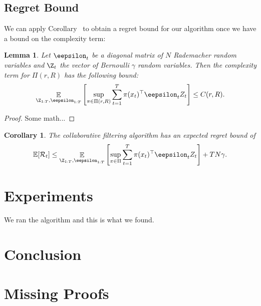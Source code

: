 \documentclass[11pt]{article}
\newcommand{\exop}{\mathop{\ex}}
\newcommand{\regret}{\mathcal{R}}
\newtheorem{lemma}{Lemma}
\newtheorem{corollary}{Corollary}
\begin{document}
\subsection{Regret Bound}
We can apply Corollary~\label{cor:oracle.regret.bound} to obtain a regret bound for our algorithm once we have a bound on the complexity term:
\begin{lemma} Let $\eepsilon_t$ be a diagonal matrix of $N$ Rademacher random variables and $\Z_t$ the vector of Bernoulli $\gamma$ random variables. Then the complexity term for $\Pi(r,R)$ has the following bound:
  \begin{equation}
    \exop_{\Z_{1:T},\eepsilon_{1:T}}\left[\sup_{\pi\in\Pi(r,R)} \sum_{t=1}^T \pi(x_t)^\top\eepsilon_t Z_t \right]
    \leq
    C(r,R).
  \end{equation}
\end{lemma}
\begin{proof}
  Some math...
\end{proof}
\begin{corollary}
  The collaborative filtering algorithm has an expected regret bound of 
\begin{equation*}
    \ex[\regret_t]
    \leq
\exop_{\Z_{1:T},\eepsilon_{1:T}}\left[\sup_{\pi\in\Pi} \sum_{t=1}^T \pi(x_t)^\top\eepsilon_t Z_t \right]    
    +
    T N \gamma.
  \end{equation*}
\end{corollary}

\section{Experiments}
We ran the algorithm and this is what we found.
\section{Conclusion}





\appendix
\onecolumn
\section{Missing Proofs}\label{sec:appendix.proofs}
\end{document}
